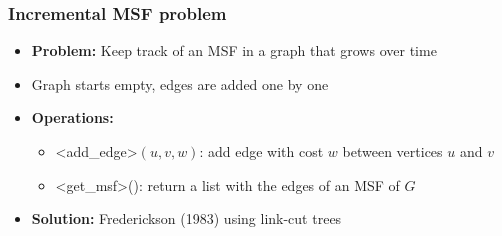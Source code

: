 \documentclass[fleqn]{beamer}
\def\texttt#1{<#1>}%
\begin{document}
\begin{frame}
    \frametitle{Incremental MSF problem}
    
    \begin{itemize}
    \item \textbf{Problem:} Keep track of an MSF in a graph that grows over time \vfill
    \item Graph starts empty, edges are added one by one \vfill\pause
    \item \textbf{Operations:}
        \begin{itemize}
        \item \texttt{add\_edge}$(u,v,w)$: add edge with cost $w$ between vertices $u$ and $v$
        \item \texttt{get\_msf}(): return a list with the edges of an MSF of $G$
        \end{itemize} \vfill\pause
    \item \textbf{Solution:} Frederickson (1983) using link-cut trees \vfill
    \end{itemize}
\end{frame}
\end{document}
